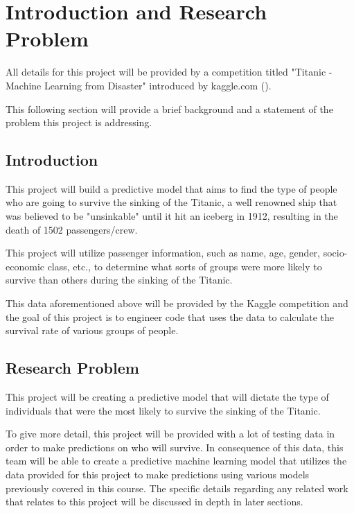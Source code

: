 \documentclass[12pt]{APA}
\begin{document}
\tableofcontents

\newpage

\section{Introduction and Research Problem}
All details for this project will be provided by a competition titled "Titanic - Machine Learning from Disaster" introduced by kaggle.com (\cite{titanic}).

This following section will provide a brief background and a statement of the problem this project is addressing.




\subsection{Introduction}

This project will build a predictive model that aims to find the type of people who are going to survive the sinking of the Titanic, a well renowned ship that was believed to be "unsinkable" until it hit an iceberg in 1912, resulting in the death of 1502 passengers/crew.

This project will utilize passenger information, such as name, age, gender, socio-economic class, etc., to determine what sorts of groups were more likely to survive than others during the sinking of the Titanic.

This data aforementioned above will be provided by the Kaggle competition and the goal of this project is to engineer code that uses the data to calculate the survival rate of various groups of people.

\subsection{Research Problem}

This project will be creating a predictive model that will dictate the type of individuals that were the most likely to survive the sinking of the Titanic.

To give more detail, this project will be provided with a lot of testing data in order to make predictions on who will survive. In consequence of this data, this team will be able to create a predictive machine learning model that utilizes the data provided for this project to make predictions using various models previously covered in this course. The specific details regarding any related work that relates to this project will be discussed in depth in later sections.
\end{document}
